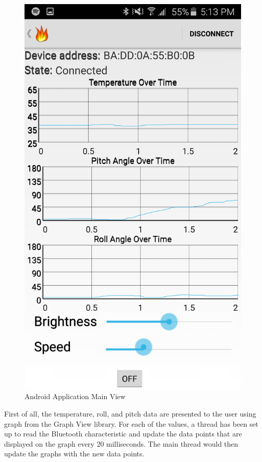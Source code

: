 \documentclass[12pt]{article}
\begin{document}
\begin{figure}[!htb]
 \centering
 \includegraphics[scale=0.15]{images/android.png}
 \caption{Android Application Main View}
 \label{fig:android}
\end{figure}

First of all, the temperature, roll, and pitch data are presented to the user using graph from the Graph View library. For each of the values, a thread has been set up to read the Bluetooth characteristic and update the data points that are displayed on the graph every 20 milliseconds. The main thread would then update the graphs with the new data points.
\end{document}
